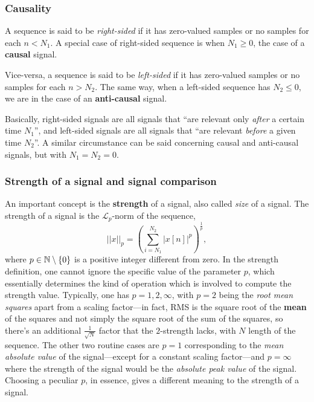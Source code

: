 \documentclass[\documentfontsize, twocolumn]{\classname}
\begin{document}
\subsubsection{Causality}
A se\-quen\-ce is said to be \emph{right-sided} if it has zero-valued samples or no samples for each $n < N_1$. A special case of right-sided se\-quen\-ce is when $N_1 \geq 0$, the case of a \textbf{causal} signal.

Vice-versa, a se\-quen\-ce is said to be \emph{left-sided} if it has zero-valued samples or no samples for each $n > N_2$. The same way, when a left-sided se\-quen\-ce has $N_2 \leq 0$, we are in the case of an \textbf{anti-causal} signal.

Basically, right-sided signals are all signals that ``are relevant only \emph{after} a certain time $N_1$'', and left-sided signals are all signals that ``are relevant \emph{before} a given time $N_2$''. A similar circumstance can be said concerning causal and anti-causal signals, but with $N_1=N_2=0$.

\subsubsection{Strength of a signal and signal comparison}

An important concept is the \textbf{strength} of a signal, also called \emph{size} of a signal. The strength of a signal is the $\mathcal{L}_p$-norm of the se\-quen\-ce,
\[
||x||_p = \left(\sum_{i=N_1}^{N_2} |x[n]|^p\right)^{\frac{1}{p}},
\]
where $p \in \mathbb N \setminus \{0\}$ is a positive integer different from zero. In the strength definition, one cannot ignore the specific value of the parameter $p$, which essentially determines the kind of operation which is involved to compute the strength value. Typically, one has $p=1,2,\infty$, with $p=2$ being the \emph{root mean squares} apart from a scaling factor---in fact, RMS is the square root of the \textbf{mean} of the squares and not simply the square root of the sum of the squares, so there's an additional $\frac{1}{\sqrt{N}}$ factor that the $2$-strength lacks, with $N$ length of the sequence. The other two routine cases are $p=1$ corresponding to the \emph{mean absolute value} of the signal---except for a constant scaling factor---and $p=\infty$ where the strength of the signal would be the \emph{absolute peak value} of the signal. Choosing a peculiar $p$, in essence, gives a different meaning to the strength of a signal.
\end{document}
